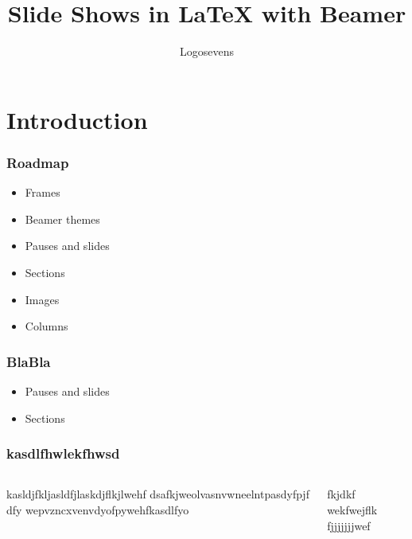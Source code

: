 \documentclass{beamer}
\title{Slide Shows in {\LaTeX} with Beamer}
\author{Logosevens}
\begin{document}
\maketitle   

\section{Introduction}

\begin{frame}
  \frametitle{Roadmap}   
  \begin{itemize}
    \item Frames\pause
    \item Beamer themes\pause
    \item Pauses and slides
    \item Sections
    \item Images
    \item Columns
  \end{itemize}
\end{frame}

\begin{frame}
  \frametitle{BlaBla}   
  \begin{itemize}
    \item Pauses and slides
    \item Sections
  \end{itemize}
   
\end{frame}


\begin{frame}
  \frametitle{kasdlfhwlekfhwsd}   

  \begin{columns}
     
    kasldjfkljasldfjlaskdjflkjlwehf dsafkjweolvasnvwneelntpasdyfpjf dfy wepvzncxvenvdyofpywehfkasdlfyo

    fkjdkf wekfwejflk fjjjjjjjwef

  \end{columns}
   
\end{frame}
\end{document}
